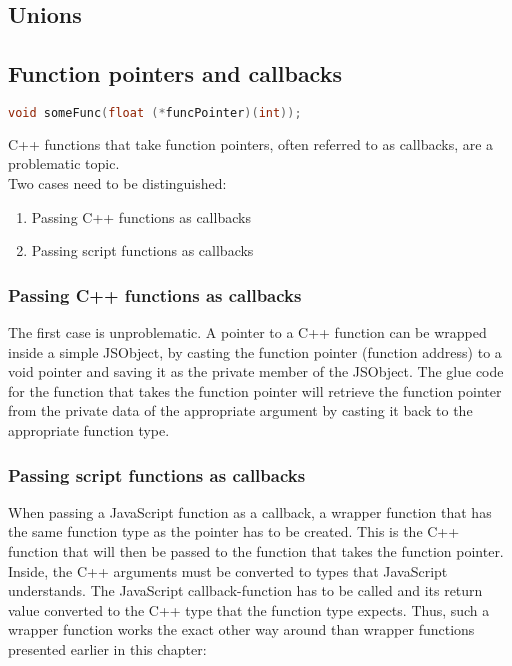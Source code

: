 \subsection{Unions}

\subsection{Function pointers and callbacks}

\SingleSpacing
\begin{lstlisting}[language=C++, caption=C++ function that takes a function pointer]
void someFunc(float (*funcPointer)(int));
\end{lstlisting}
\OnehalfSpacing

C++ functions that take function pointers, often referred to as callbacks, are a problematic topic.\\
Two cases need to be distinguished:
\begin{enumerate}
\item Passing C++ functions as callbacks
\item Passing script functions as callbacks
\end{enumerate}

\subsubsection{Passing C++ functions as callbacks}

The first case is unproblematic. A pointer to a C++ function can be wrapped inside a simple JSObject, by casting the function pointer (function address) to a void pointer and saving it as the private member of the JSObject. The glue code for the function that takes the function pointer will retrieve the function pointer from the private data of the appropriate argument by casting it back to the appropriate function type.

\subsubsection{Passing script functions as callbacks}

When passing a JavaScript function as a callback, a wrapper function that has the same function type as the pointer has to be created. This is the C++ function that will then be passed to the function that takes the function pointer. Inside, the C++ arguments must be converted to types that JavaScript understands. The JavaScript callback-function has to be called and its return value converted to the C++ type that the function type expects. Thus, such a wrapper function works the exact other way around than wrapper functions presented earlier in this chapter:

